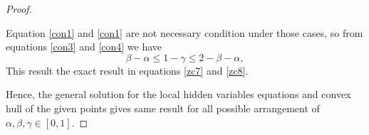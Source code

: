 \begin{proof}
\begin{itemize}
Equation \ref{con1} and \ref{con1} are not necessary condition under those cases, so from equations \ref{con3} and \ref{con4} we have
\begin{equation}
\beta-\alpha \leq 1-\gamma \leq 2-\beta-\alpha, 
\end{equation}
This result the exact result in equations \ref{zc7} and \ref{zc8}.
\end{itemize}
Hence, the general solution for the local hidden variables equations  and convex hull of the given points gives  same result for  all possible arrangement of $\alpha, \beta , \gamma \in [0,1]$.
\end{proof}